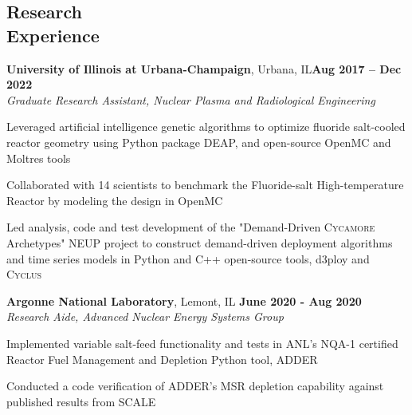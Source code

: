 \documentclass[margin,line]{resume}
\newcommand{\Cyclus}{\textsc{Cyclus}\xspace}%
\begin{document}
\begin{resume}
    \section{\mysidestyle Research\\Experience}
    \textbf{University of Illinois at Urbana-Champaign}, Urbana, IL\hfill \textbf{Aug 2017 -- Dec 2022}\\
		\textsl{Graduate Research Assistant, Nuclear Plasma and Radiological Engineering}\\\vspace{-3.7mm}
                \begin{list2}
                        \item Leveraged artificial intelligence genetic algorithms to optimize fluoride salt-cooled 
                        reactor geometry using Python package DEAP, 
                        and open-source OpenMC and Moltres tools
                        \item Collaborated with 14 scientists to benchmark the Fluoride-salt High-temperature 
                        Reactor by modeling the design in OpenMC
                        \item Led analysis, code and test development of the "Demand-Driven \textsc{Cycamore} Archetypes" 
                        NEUP project to construct demand-driven deployment algorithms and time series models in 
                        Python and C++ open-source tools, d3ploy and \Cyclus
                \end{list2}\vspace{-1.5mm}

\textbf{Argonne National Laboratory}, Lemont, IL \hfill \textbf{June 2020 - Aug 2020}\\\vspace{-4mm}%
		\textsl{Research Aide, Advanced Nuclear Energy Systems Group}\\
                \begin{list2}
                        \item Implemented variable salt-feed functionality and tests in ANL's NQA-1 certified Reactor Fuel Management 
                        and Depletion Python tool, ADDER
                        \item Conducted a code verification of ADDER's MSR depletion capability against published results from SCALE 
                \end{list2}\vspace{-1.5mm}


\end{resume}
\end{document}
